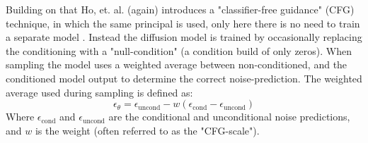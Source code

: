 Building on that Ho, et. al. (again) introduces a "classifier-free guidance" (CFG) technique, in which the same principal is used, only here there is no need to train a separate model \cite{cfg-diffusion}. Instead the diffusion model is trained by occasionally replacing the conditioning with a "null-condition" (a condition build of only zeros). When sampling the model uses a weighted average between non-conditioned, and the conditioned model output to determine the correct noise-prediction. The weighted average used during sampling is defined as:
\begin{equation}
    \epsilon_{\theta} = \epsilon_{\text{uncond}} - w(\epsilon_{\text{cond}} - \epsilon_{\text{uncond}})
\end{equation}
Where $\epsilon_{\text{cond}}$ and $\epsilon_{\text{uncond}}$ are the conditional and unconditional noise predictions, and $w$ is the weight (often referred to as the "CFG-scale").





